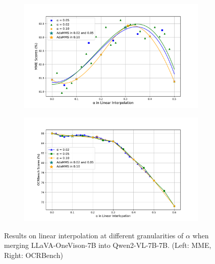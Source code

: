 \begin{figure}
    \centering
   
    \begin{subfigure}[b]{0.43\textwidth}
        \centering
        \includegraphics[width=\textwidth, bb=0 0 720 432]{figure/mme_values_plot_new.pdf}
    \end{subfigure}
    \begin{subfigure}[b]{0.43\textwidth}
        \centering
        \includegraphics[width=\textwidth, bb=0 0 720 432]{figure/ocr_values_plot_new.pdf}
    \end{subfigure}
    \caption{Results on linear interpolation at different granularities of $\alpha$ when merging LLaVA-OneVison-7B into Qwen2-VL-7B-7B. (Left: MME, Right: OCRBench)}
    \label{fig:step_size}
\end{figure}


